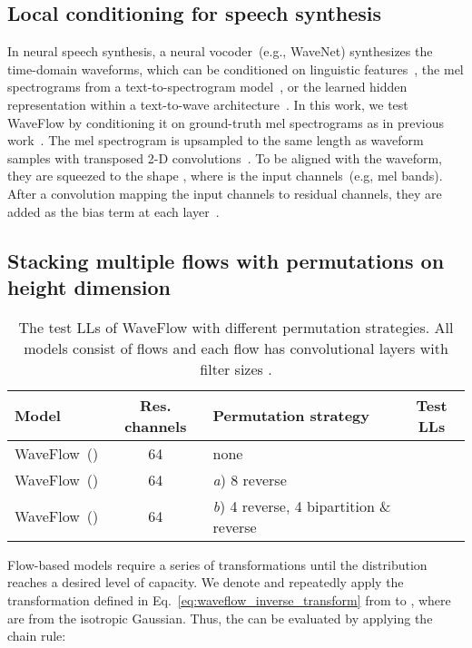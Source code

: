 \documentclass{article}
\begin{document}
\subsection{Local conditioning for speech synthesis}
\vspace{-.1em}
In neural speech synthesis, a neural vocoder~(e.g., WaveNet) synthesizes the time-domain waveforms, which can be conditioned on linguistic features~\citep{oord2016wavenet,arik2017DV1}, the mel spectrograms from a text-to-spectrogram model~\citep{ping2017deep, shen2018tacotron2}, or the learned hidden representation within a text-to-wave architecture~\citep{ping2018clarinet}. 
In this work, we test WaveFlow by conditioning it on ground-truth mel spectrograms as in previous work~\citep{prenger2019waveglow,kim2018flowavenet}.
The mel spectrogram is upsampled to the same length as waveform samples with transposed 2-D convolutions~\citep{ping2018clarinet}.
To be aligned with the waveform, they are squeezed to the shape , where  is the input channels~(e.g, mel bands).
After a  convolution mapping the input channels to residual channels, they are added as the bias term at each layer~\citep{ping2018clarinet}.

\vspace{-.1em}
\subsection{Stacking multiple flows with permutations on height dimension}
\label{subsec:stacking_permutate}
\vspace{-0.1em}
\begin{table*}[t!]
\centering
\caption{The test LLs of WaveFlow with different permutation strategies. All models consist of  flows and each flow has  convolutional layers with filter sizes .}
\vspace{0.1em}
\begin{tabular}{l|c|l|c}
\hline 
{Model} & Res. channels  & \qquad\qquad Permutation strategy & Test LLs
\\ \hline
WaveFlow~() & 64 &  none &  \\ 
WaveFlow~() & 64 & \emph{a}) 8 reverse   &  \\ 
WaveFlow~() & 64 & \emph{b}) 4 reverse, 4 bipartition \& reverse &  \\ 
\hline
\end{tabular}
\label{tab:lls_reverse}
\end{table*}
Flow-based models require a series of transformations until the distribution  reaches a desired level of capacity.
We denote  and repeatedly apply the transformation  defined in Eq.~\eqref{eq:waveflow_inverse_transform} from  to  , where  are from the isotropic Gaussian.
Thus, the  can be evaluated by applying the chain rule:
\end{document}
